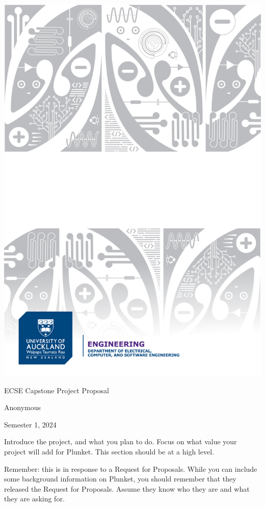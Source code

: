 \documentclass{capstone}
\begin{document}
\titlepage
	{\includegraphics[width=\paperwidth]{ecse-decal-title}}
	{
		\centering
		{\Large ECSE Capstone Project Proposal\par}
		\vspace{16pt} 
		{Anonymous\par} 
		\vspace{16pt}
		{Semester 1, 2024\par} 
	}

\tableofcontents
\newpage


Introduce the project, and what you plan to do. Focus on what value your project will add for Plunket. This section should be at a high level.

Remember: this is in response to a Request for Proposals. While you can include some background information on Plunket, you should remember that they released the Request for Proposals. Assume they know who they are and what they are asking for.
\end{document}
